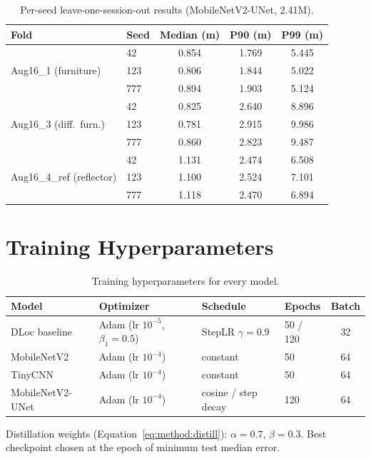 \begin{table}[H]
\centering
\caption{Per-seed leave-one-session-out results (MobileNetV2-UNet, 2.41M).}
\label{tab:app:crossseed}
\begin{tabular}{@{}llccc@{}}
\toprule
\textbf{Fold} & \textbf{Seed} & \textbf{Median (m)} & \textbf{P90 (m)} & \textbf{P99 (m)} \\
\midrule
\multirow{3}{*}{Aug16\_1 (furniture)}    & 42  & 0.854 & 1.769 & 5.445 \\
                                         & 123 & 0.806 & 1.844 & 5.022 \\
                                         & 777 & 0.894 & 1.903 & 5.124 \\
\midrule
\multirow{3}{*}{Aug16\_3 (diff.\ furn.)} & 42  & 0.825 & 2.640 & 8.896 \\
                                         & 123 & 0.781 & 2.915 & 9.986 \\
                                         & 777 & 0.860 & 2.823 & 9.487 \\
\midrule
\multirow{3}{*}{Aug16\_4\_ref (reflector)}& 42 & 1.131 & 2.474 & 6.508 \\
                                         & 123 & 1.100 & 2.524 & 7.101 \\
                                         & 777 & 1.118 & 2.470 & 6.894 \\
\bottomrule
\end{tabular}
\end{table}

\section{Training Hyperparameters}
\label{app:hyper}

\begin{table}[H]
\centering
\caption{Training hyperparameters for every model.}
\label{tab:app:hyper}
\begin{tabular}{@{}llllc@{}}
\toprule
\textbf{Model} & \textbf{Optimizer} & \textbf{Schedule} & \textbf{Epochs} & \textbf{Batch} \\
\midrule
DLoc baseline    & Adam (lr $10^{-5}$, $\beta_1{=}0.5$) & StepLR $\gamma{=}0.9$ & 50 / 120 & 32 \\
MobileNetV2      & Adam (lr $10^{-4}$) & constant & 50 & 64 \\
TinyCNN          & Adam (lr $10^{-4}$) & constant & 50 & 64 \\
MobileNetV2-UNet & Adam (lr $10^{-4}$) & cosine / step decay & 120 & 64 \\
\bottomrule
\end{tabular}

\vspace{0.4em}
{\footnotesize Distillation weights (Equation~\ref{eq:method:distill}): $\alpha = 0.7$,
$\beta = 0.3$. Best checkpoint chosen at the epoch of minimum test median error.}
\end{table}

